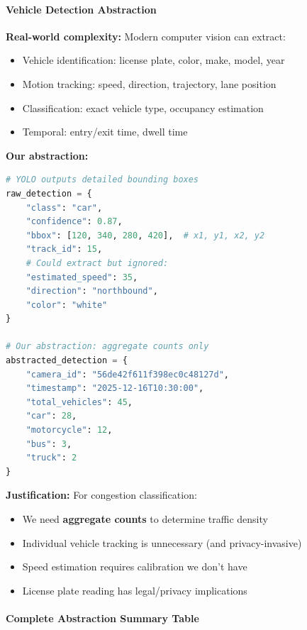 \paragraph{Vehicle Detection Abstraction}

\textbf{Real-world complexity:} Modern computer vision can extract:
\begin{itemize}[noitemsep]
    \item Vehicle identification: license plate, color, make, model, year
    \item Motion tracking: speed, direction, trajectory, lane position
    \item Classification: exact vehicle type, occupancy estimation
    \item Temporal: entry/exit time, dwell time
\end{itemize}

\textbf{Our abstraction:}
\begin{lstlisting}[language=Python, caption={Vehicle Detection Abstraction}]
# YOLO outputs detailed bounding boxes
raw_detection = {
    "class": "car",
    "confidence": 0.87,
    "bbox": [120, 340, 280, 420],  # x1, y1, x2, y2
    "track_id": 15,
    # Could extract but ignored:
    "estimated_speed": 35,
    "direction": "northbound",
    "color": "white"
}

# Our abstraction: aggregate counts only
abstracted_detection = {
    "camera_id": "56de42f611f398ec0c48127d",
    "timestamp": "2025-12-16T10:30:00",
    "total_vehicles": 45,
    "car": 28,
    "motorcycle": 12,
    "bus": 3,
    "truck": 2
}
\end{lstlisting}

\textbf{Justification:} For congestion classification:
\begin{itemize}[noitemsep]
    \item We need \textbf{aggregate counts} to determine traffic density
    \item Individual vehicle tracking is unnecessary (and privacy-invasive)
    \item Speed estimation requires calibration we don't have
    \item License plate reading has legal/privacy implications
\end{itemize}

\paragraph{Complete Abstraction Summary Table}

